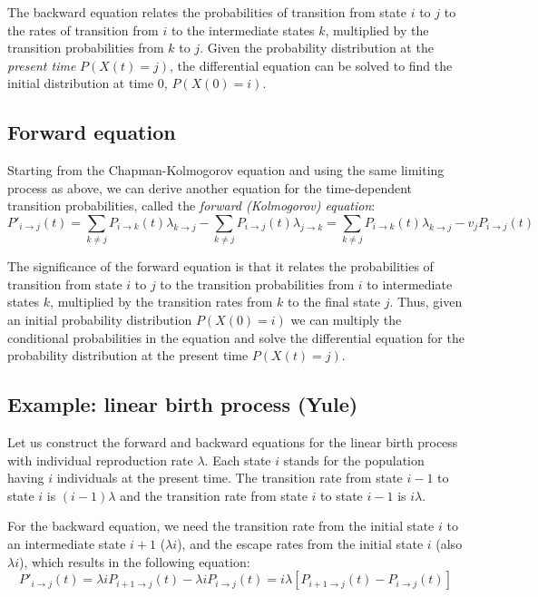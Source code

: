 \documentclass[11pt]{book}
\begin{document}
The backward equation relates the probabilities of transition from state $i$ to $j$ to the rates of transition from $i$ to the intermediate states $k$, multiplied by the transition probabilities from $k$ to $j$. Given the probability distribution at the \emph{present time} $P(X(t) = j)$, the differential equation can be solved to find the initial distribution at time $0$, $P(X(0) = i)$.

\subsection{Forward equation}
Starting from the Chapman-Kolmogorov equation and using the same limiting process as above, we can derive another equation for the time-dependent transition probabilities, called the \emph{forward (Kolmogorov) equation}:
$$ P'_{i \rightarrow j} (t) =  \sum_{k \neq j} P_{i  \rightarrow k}(t) \lambda_{k \rightarrow j}  - \sum_{k \neq j} P_{i \rightarrow j}(t) \lambda_{j \rightarrow k} = 
 \sum_{k \neq j}	P_{i  \rightarrow k}(t) \lambda_{k \rightarrow j}  - v_j P_{i \rightarrow j}(t)$$

The significance of the forward equation is that it relates the probabilities of transition from state $i$ to $j$ to the transition probabilities from $i$ to intermediate states $k$, multiplied by the transition rates from $k$ to the final state $j$. Thus, given an initial probability distribution $P(X(0) = i)$ we can multiply the conditional probabilities in the equation and solve the differential equation for the probability distribution at the present time $P(X(t) = j)$.

\subsection{Example: linear birth process (Yule)}
Let us construct the forward and backward equations for the linear birth process with individual reproduction rate $\lambda$. Each state $i$ stands for the population having $i$ individuals at the present time. The transition rate from state $i-1$ to state $i$ is $(i-1)\lambda$ and the transition rate from state $i$ to state $i-1$ is $i \lambda$. 

For the backward equation, we need the transition rate from the initial state $i$ to an intermediate state $i+1$ ($\lambda i $), and the escape rates from the initial state $i$ (also  $\lambda i $), which results in the following equation:
$$ P'_{i \rightarrow j} (t) =  \lambda i P_{i+1 \rightarrow j}(t)  -  \lambda i  P_{i  \rightarrow j}(t) = i \lambda [P_{i+1 \rightarrow j}(t) -  P_{i  \rightarrow j}(t)] $$
\end{document}
